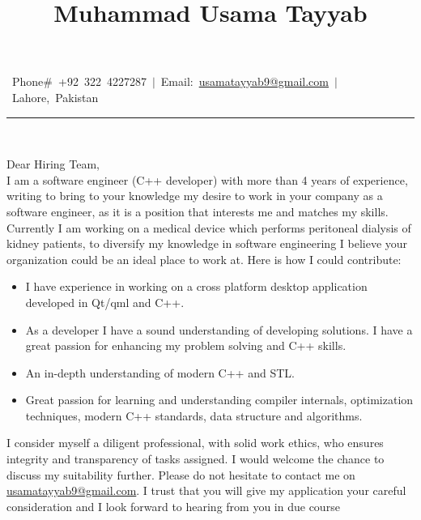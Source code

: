 \documentclass[9pt,a4paper]{article}
\title{\textbf{Muhammad Usama Tayyab}}
\date{}
\author{}
\newcommand{\MyHorizontalLine}{\noindent\rule{\textwidth}{1.5pt}\\}
\begin{document}
	\maketitle
	\vspace{-0.25in} %
	\centering\mbox{
		 Phone$\#$ +92 322 4227287
		 $\vert$ Email: \href{mailto:usamatayyab9@gmail.com} {usamatayyab9@gmail.com}
		 $\vert$
		 Lahore, Pakistan
	}
\MyHorizontalLine
\vspace{2mm}
\begin{justify}
	Dear Hiring Team,\\ \newline
	I am a software engineer (C++ developer) with more than 4 years of experience, writing to bring to your knowledge my desire to work in your company as a software engineer, as it is a position that interests me and matches my skills. Currently I am working on a medical device which performs peritoneal dialysis of kidney patients, to diversify my knowledge in software engineering I believe your organization could be an ideal place to work at. Here is how I could contribute:
	\begin{itemize}
		\item I have experience in working on a cross platform desktop application developed in Qt/qml and C++.
		\item As a developer I have a sound understanding of developing solutions. I have a great passion for enhancing my problem solving and C++ skills.
		\item An in-depth understanding of modern C++ and STL.
		\item Great passion for learning and understanding compiler internals, optimization techniques, modern C++ standards, data structure and algorithms.
	\end{itemize}
	I consider myself a diligent professional, with solid work ethics, who ensures integrity and transparency of tasks assigned. I would welcome the chance to discuss my suitability further. Please do not hesitate to contact me on \href{usamatayyab9@gmail.com}{usamatayyab9@gmail.com}. I trust that you will give my application your careful consideration and I look forward to hearing from you in due course
\end{justify}
\end{document}
